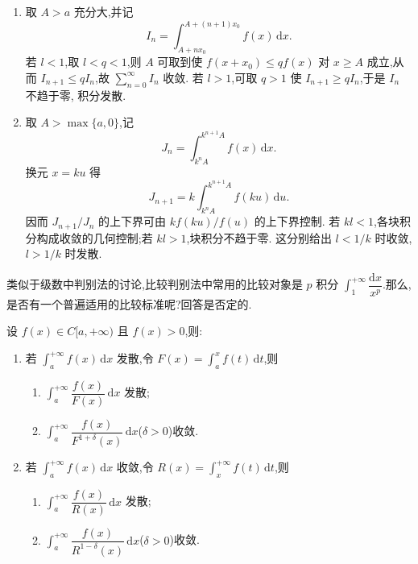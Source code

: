 \begin{solution}
  \leavevmode
  \begin{enumerate}
    \item 取 $A>a$ 充分大,并记
          \[
            I_n=\int_{A+nx_0}^{A+(n+1)x_0}f(x)\,\mathrm{d}x.
          \]
          若 $l<1$,取 $l<q<1$,则 $A$ 可取到使
          $f(x+x_0)\leq qf(x)$ 对 $x\geq A$ 成立,从而
          $I_{n+1}\leq qI_n$,故 $\displaystyle\sum\limits_{n=0}^{\infty}I_n$ 收敛.
          若 $l>1$,可取 $q>1$ 使 $I_{n+1}\geq qI_n$,于是 $I_n$ 不趋于零,
          积分发散.

    \item 取 $A>\max\{a,0\}$,记
          \[
            J_n=\int_{k^nA}^{k^{n+1}A}f(x)\,\mathrm{d}x.
          \]
          换元 $x=ku$ 得
          \[
            J_{n+1}=k\int_{k^nA}^{k^{n+1}A}f(ku)\,\mathrm{d}u.
          \]
          因而 $J_{n+1}/J_n$ 的上下界可由 $k f(ku)/f(u)$ 的上下界控制.
          若 $kl<1$,各块积分构成收敛的几何控制;若 $kl>1$,块积分不趋于零.
          这分别给出 $l<1/k$ 时收敛,$l>1/k$ 时发散.
  \end{enumerate}
\end{solution}

类似于级数中判别法的讨论,比较判别法中常用的比较对象是 $p$ 积分 $\displaystyle\int_1^{+\infty}\dfrac{\mathrm{d}x}{x^p}$.那么,是否有一个普遍适用的比较标准呢?回答是否定的.

\begin{proposition}[\markstar]
  设 $f(x)\in C\lbrack a,+\infty)$ 且 $f(x)>0$,则:
  \begin{enumerate}
    \item 若 $\displaystyle\int_a^{+\infty}f(x)\,\mathrm{d}x$ 发散,令 $\displaystyle F(x)=\int_a^xf(t)\,\mathrm{d}t$,则
          \begin{enumerate}
            \item $\displaystyle\int_a^{+\infty}\dfrac{f(x)}{F(x)}\,\mathrm{d}x$ 发散;
            \item $\displaystyle\int_a^{+\infty}\dfrac{f(x)}{F^{1+\delta}(x)}\,\mathrm{d}x$($\delta>0$)收敛.
          \end{enumerate}
    \item 若 $\displaystyle\int_a^{+\infty}f(x)\,\mathrm{d}x$ 收敛,令 $\displaystyle R(x)=\int_x^{+\infty}f(t)\,\mathrm{d}t$,则
          \begin{enumerate}
            \item $\displaystyle\int_a^{+\infty}\dfrac{f(x)}{R(x)}\,\mathrm{d}x$ 发散;
            \item $\displaystyle\int_a^{+\infty}\dfrac{f(x)}{R^{1-\delta}(x)}\,\mathrm{d}x$($\delta>0$)收敛.
          \end{enumerate}
  \end{enumerate}
\end{proposition}



